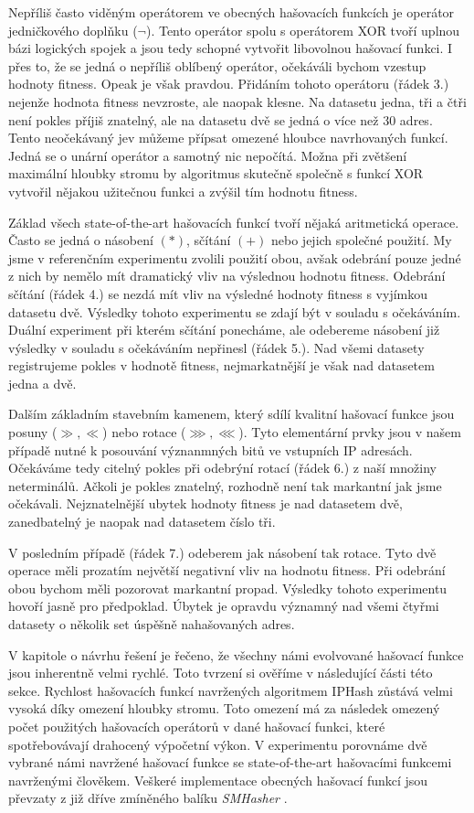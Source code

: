 Nepříliš často viděným operátorem ve obecných hašovacích funkcích je operátor jedničkového doplňku ($\neg$).
Tento operátor
spolu s operátorem XOR tvoří uplnou bázi logických spojek a jsou tedy schopné vytvořit libovolnou hašovací funkci.
I přes to, že se jedná o nepříliš oblíbený operátor, očekáváli bychom vzestup hodnoty fitness.
Opeak je však pravdou. Přidáním tohoto operátoru (řádek 3.) nejenže hodnota fitness nevzroste, ale naopak klesne. Na datasetu
jedna, tři a čtři není pokles příjiš znatelný, ale na datasetu dvě se jedná o více než 30 adres. Tento neočekávaný jev
můžeme přípsat omezené hloubce navrhovaných funkcí. Jedná se o unární operátor a samotný nic nepočítá. Možna při 
zvětšení maximální hloubky stromu by algoritmus skutečně společně s funkcí XOR vytvořil nějakou užitečnou funkci a
zvýšil tím hodnotu fitness.

Základ všech state-of-the-art hašovacích funkcí tvoří nějaká aritmetická operace. Často
se jedná o násobení $(*)$, sčítání $(+)$ nebo jejich společné použití. My jsme v referenčním experimentu zvolili použití 
obou, avšak odebrání pouze jedné z nich by nemělo mít dramatický vliv na výslednou hodnotu fitness. Odebrání
sčítání (řádek 4.) se nezdá mít vliv na výsledné hodnoty fitness s vyjímkou datasetu dvě. Výsledky tohoto
experimentu se zdají být v souladu s očekáváním. Duální experiment při kterém sčítání ponecháme, ale odebereme
násobení již výsledky v souladu s očekáváním nepřinesl (řádek 5.). Nad všemi datasety registrujeme pokles v hodnotě
fitness, nejmarkatnější je však nad datasetem jedna a dvě.

Dalším základním stavebním kamenem, který sdílí kvalitní hašovací funkce jsou posuny ($\gg , \ll$) nebo rotace
($\ggg , \lll$). Tyto elementární prvky jsou v našem případě nutné k posouvání význanmných bitů ve vstupních IP
adresách. Očekáváme tedy citelný pokles při odebrýní rotací (řádek 6.) z naší množiny neterminálů. Ačkoli je pokles
znatelný, rozhodně není tak markantní jak jsme očekávali. Nejznatelnější ubytek hodnoty fitness je nad datasetem dvě,
zanedbatelný je naopak nad datasetem číslo tři.

V posledním případě (řádek 7.) odeberem jak násobení tak rotace. Tyto dvě operace měli prozatím největší negativní
vliv na hodnotu fitness. Při odebrání obou bychom měli pozorovat markantní propad. Výsledky tohoto experimentu 
hovoří jasně pro předpoklad. Úbytek je opravdu významný nad všemi čtyřmi datasety o několik set úspěšně nahašovaných adres.

V kapitole o návrhu řešení je řečeno, že všechny námi evolvované hašovací funkce jsou inherentně velmi rychlé. Toto
tvrzení si ověříme v následující části této sekce. Rychlost hašovacích funkcí navržených algoritmem IPHash zůstává
velmi vysoká díky omezení hloubky stromu. Toto omezení má za následek omezený počet použitých hašovacích operátorů v
dané hašovací funkci, které spotřebovávají drahocený výpočetní výkon. V experimentu porovnáme dvě vybrané námi navržené
hašovací funkce se state-of-the-art hašovacími funkcemi navrženými člověkem. Veškeré implementace obecných hašovací funkcí
jsou převzaty z již dříve zmíněného balíku \textit{SMHasher} \cite{appleby2016}. 


